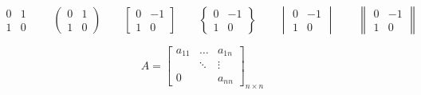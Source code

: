 \documentclass{ctexart}
\begin{document}
	\[			%
	\begin{matrix}		%
		0 & 1 \\
		1 & 0	
	\end{matrix}		%
	\qquad			%
	\begin{pmatrix}		%
		0 & 1 \\
		1 & 0	
	\end{pmatrix}		%
	\qquad
	\begin{bmatrix}		%
		0 & -1 \\
		1 & 0
	\end{bmatrix}
	\qquad
	\begin{Bmatrix}		%
		0 & -1 \\
		1 & 0
	\end{Bmatrix}
	\qquad
	\begin{vmatrix}		%
		0 & -1 \\
		1 & 0
	\end{vmatrix}
	\qquad
	\begin{Vmatrix}		%
		0 & -1 \\
		1 & 0
	\end{Vmatrix}
	\]		%

	\[
	A = \begin{bmatrix}	%
		a_{11} & \dots & a_{1n} \\
		 & \ddots & \vdots \\
		0 & & a_{nn}
	\end{bmatrix}_{n \times n}	%
	\]			
\end{document}
